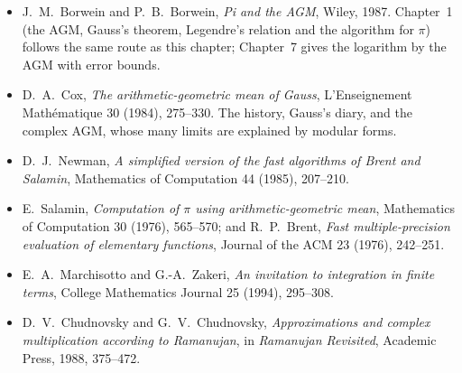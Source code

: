 \begin{itemize}
\item J.~M.~Borwein and P.~B.~Borwein, \emph{Pi and the AGM}, Wiley, 1987. Chapter~1 (the AGM, Gauss's theorem, Legendre's relation and the
algorithm for $\pi$) follows the same route as this chapter; Chapter~7 gives the logarithm by the AGM with error bounds.
\item D.~A.~Cox, \emph{The arithmetic-geometric mean of Gauss}, L'Enseignement Math\'ematique 30 (1984), 275--330. The history, Gauss's diary,
and the complex AGM, whose many limits are explained by modular forms.
\item D.~J.~Newman, \emph{A simplified version of the fast algorithms of Brent and Salamin}, Mathematics of Computation 44 (1985), 207--210.
\item E.~Salamin, \emph{Computation of $\pi$ using arithmetic-geometric mean}, Mathematics of Computation 30 (1976), 565--570; and R.~P.~Brent,
\emph{Fast multiple-precision evaluation of elementary functions}, Journal of the ACM 23 (1976), 242--251.
\item E.~A.~Marchisotto and G.-A.~Zakeri, \emph{An invitation to integration in finite terms}, College Mathematics Journal 25 (1994), 295--308.
\item D.~V.~Chudnovsky and G.~V.~Chudnovsky, \emph{Approximations and complex multiplication according to Ramanujan}, in \emph{Ramanujan
Revisited}, Academic Press, 1988, 375--472.
\end{itemize}
